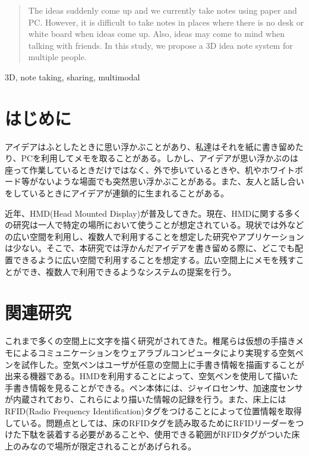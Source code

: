 \documentclass{hissymp}
\begin{document}

\begin{abstract}
The ideas suddenly come up and we currently take notes using paper and PC. However, it is difficult to take notes in places where there is no desk or white board  when ideas come up. Also, ideas may come to mind when talking with friends. In this study, we propose a 3D idea note system for multiple people.
\end{abstract}

\begin{keyword}	
3D, note taking, sharing, multimodal
\end{keyword}

\maketitle	



\section{はじめに}
アイデアはふとしたときに思い浮かぶことがあり、私達はそれを紙に書き留めたり、PCを利用してメモを取ることがある。しかし、アイデアが思い浮かぶのは座って作業しているときだけではなく、外で歩いているときや、机やホワイトボード等がないような場面でも突然思い浮かぶことがある。また、友人と話し合いをしているときにアイデアが連鎖的に生まれることがある。

近年、HMD(Head Mounted Display)が普及してきた。現在、HMDに関する多くの研究は一人で特定の場所において使うことが想定されている。現状では外などの広い空間を利用し、複数人で利用することを想定した研究やアプリケーションは少ない。そこで、本研究では浮かんだアイデアを書き留める際に、どこでも配置できるように広い空間で利用することを想定する。広い空間上にメモを残すことができ、複数人で利用できるようなシステムの提案を行う。


\section{関連研究}
これまで多くの空間上に文字を描く研究がされてきた。椎尾ら\cite{tex1,tex2}は仮想の手描きメモによるコミュニケーションをウェアラブルコンピュータにより実現する空気ペンを試作した。空気ペンはユーザが任意の空間上に手書き情報を描画することが出来る機器である。HMDを利用することによって、空気ペンを使用して描いた手書き情報を見ることができる。ペン本体には、ジャイロセンサ、加速度センサが内蔵されており、これらにより描いた情報の記録を行う。また、床上にはRFID(Radio Frequency Identification)タグをつけることによって位置情報を取得している。問題点としては、床のRFIDタグを読み取るためにRFIDリーダーをつけた下駄を装着する必要があることや、使用できる範囲がRFIDタグがついた床上のみなので場所が限定されることがあげられる。
\end{document}
